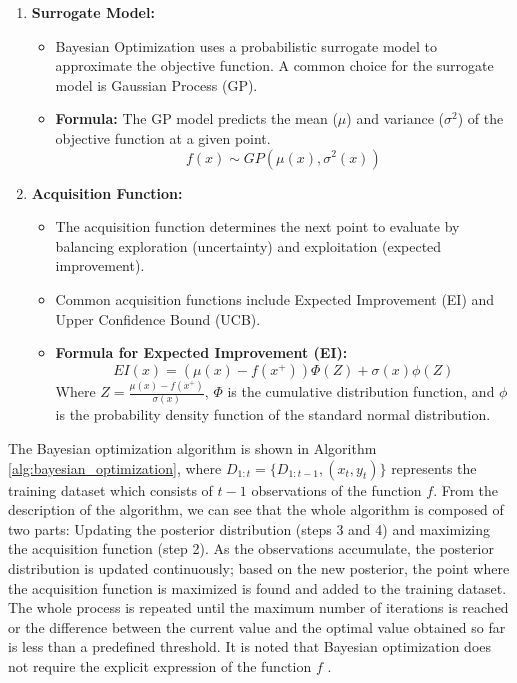 \documentclass[a4paper]{article}
\begin{document}
\begin{enumerate}
    \item \textbf{Surrogate Model:}
    \begin{itemize}
        \item Bayesian Optimization uses a probabilistic surrogate model to approximate the objective function. A common choice for the surrogate model is Gaussian Process (GP).
        \item \textbf{Formula:} The GP model predicts the mean ($\mu$) and variance ($\sigma^2$) of the objective function at a given point.
        \[
        f(x) \sim GP(\mu(x), \sigma^2(x))
        \]
    \end{itemize}
    
    \item \textbf{Acquisition Function:}
    \begin{itemize}
        \item The acquisition function determines the next point to evaluate by balancing exploration (uncertainty) and exploitation (expected improvement).
        \item Common acquisition functions include Expected Improvement (EI) and Upper Confidence Bound (UCB).
        \item \textbf{Formula for Expected Improvement (EI):}
        \[
        EI(x) = (\mu(x) - f(x^+))\Phi(Z) + \sigma(x)\phi(Z)
        \]
        Where $Z = \frac{\mu(x) - f(x^+)}{\sigma(x)}$, $\Phi$ is the cumulative distribution function, and $\phi$ is the probability density function of the standard normal distribution.
    \end{itemize}
    
\end{enumerate}



The Bayesian optimization algorithm is shown in Algorithm \ref{alg:bayesian_optimization}, where \( D_{1:t} = \{D_{1:t-1}, (x_t, y_t)\} \) represents the training dataset which consists of \( t-1 \) observations of the function \( f \). From the description of the algorithm, we can see that the whole algorithm is composed of two parts: Updating the posterior distribution (steps 3 and 4) and maximizing the acquisition function (step 2). As the observations accumulate, the posterior distribution is updated continuously; based on the new posterior, the point where the acquisition function is maximized is found and added to the training dataset. The whole process is repeated until the maximum number of iterations is reached or the difference between the current value and the optimal value obtained so far is less than a predefined threshold. It is noted that Bayesian optimization does not require the explicit expression of the function \( f \) \citep{practical_Bayesian}.
\end{document}
